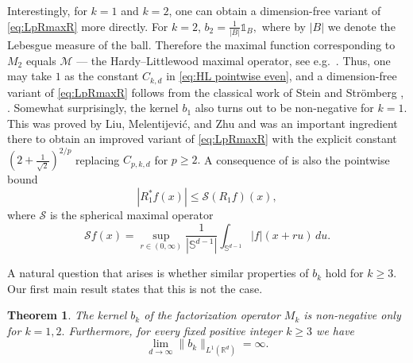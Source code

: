 \documentclass[a4paper,12pt,reqno]{amsart}
\numberwithin{equation}{section}
\newtheorem{theorem}{Theorem}[section]
\theoremstyle{definition}
\newcommand{\ind}{\mathbb{1}}
\newcommand{\R}{\mathbb{R}}
\newcommand{\sph}{\mathbb{S}}
\newcommand{\mM}{\mathcal{M}}
\newcommand{\mS}{\mathcal{S}}
\renewcommand{\le}{\leqslant}
\renewcommand{\ge}{\geqslant}
\begin{document}
Interestingly,  for $k=1$ and $k=2$, one can obtain a dimension-free variant of \eqref{eq:LpRmaxR} more directly. For $k=2$,  $b_2=\frac{1}{|B|}\ind_{B},$ where by $|B|$ we denote the Lebesgue measure of the ball. Therefore the maximal function corresponding to $M_2$ equals $\mM$ --- the Hardy--Littlewood maximal operator, see e.g.\ \cite[p.\ 427]{verdera conf}. Thus, one may take $1$ as the constant $C_{k,d}$ in \eqref{eq:HL pointwise even}, and a dimension-free variant of  \eqref{eq:LpRmaxR} follows from the classical work of Stein and Str\"omberg \cite{SteinMax}, \cite{StStr}. Somewhat surprisingly,  the kernel $b_1$ also turns out to be non-negative for $k = 1$. This was proved by Liu, Melentijević, and Zhu \cite{LiuMeZhu} and was an important ingredient there to obtain an improved variant of \eqref{eq:LpRmaxR} with the explicit constant $ (2+\frac{1}{\sqrt{2}})^{2/p}$ replacing $C_{p,k,d}$ for $p\ge 2.$ A consequence of \cite{LiuMeZhu} is also the pointwise bound
\begin{equation}
\label{eq: R1mS}
|R_1^*f(x)|\le \mS(R_1 f)(x),
\end{equation}
where $\mS$ is the spherical maximal operator
\[
\mS f(x)=\sup_{r \in (0, \infty)} \frac{1}{|\sph^{d - 1}|} \int_{\sph^{d - 1}} |f|(x + r u) \, du.
\]

A natural question that arises is whether similar properties of $b_k$ hold for $k\ge 3.$ Our first main result states that this is not the case.

\begin{theorem}
    \label{thm: bkL1}
    The kernel $b_k$ of the factorization operator $M_k$ is non-negative only for $k=1,2.$ Furthermore, for every fixed positive integer $k\ge 3$ we have
    \begin{equation}
\label{eq: bkL1 lim}
\lim_{d\to \infty}\|b_k\|_{L^1(\R^d)}=\infty.
    \end{equation}
\end{theorem}
\end{document}

